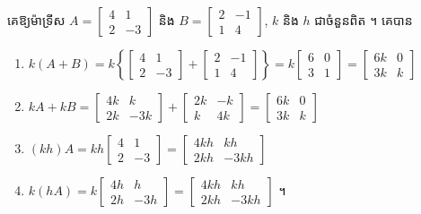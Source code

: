 \begin{example}[ឧទាហរណ៍ ២]
គេឱ្យម៉ាទ្រីស $A = \begin{bmatrix} 4 & 1\\ 2 & -3 \end{bmatrix}$ និង $B = \begin{bmatrix} 2 & -1\\ 1 & 4 \end{bmatrix}$, $k$ និង $h$ ជាចំនួនពិត ។ គេបាន
\begin{enumerate}[a]
  \item $k(A + B) = k\left\{\begin{bmatrix} 4 & 1\\ 2 & -3 \end{bmatrix} + \begin{bmatrix} 2 & -1\\ 1 & 4 \end{bmatrix}\right\} = k\begin{bmatrix} 6 & 0\\ 3 & 1 \end{bmatrix} = \begin{bmatrix} 6k & 0\\ 3k & k \end{bmatrix}$
  \item $kA + kB = \begin{bmatrix} 4k & k\\ 2k & -3k \end{bmatrix} + \begin{bmatrix} 2k & -k\\ k & 4k \end{bmatrix} = \begin{bmatrix} 6k & 0\\ 3k & k \end{bmatrix}$
  \item $(kh)A = kh\begin{bmatrix} 4 & 1\\ 2 & -3 \end{bmatrix} = \begin{bmatrix} 4kh & kh\\ 2kh & -3kh \end{bmatrix}$
  \item $k(hA) = k\begin{bmatrix} 4h & h\\ 2h & -3h \end{bmatrix} = \begin{bmatrix} 4kh & kh\\ 2kh & -3kh \end{bmatrix}$ ។
\end{enumerate}
\end{example}

